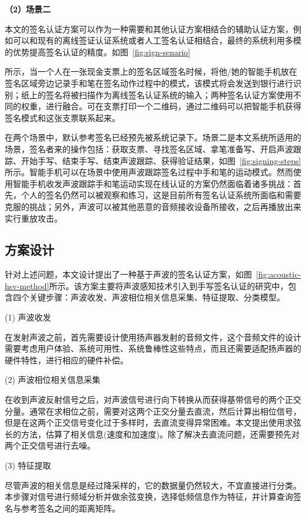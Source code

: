 \textbf{（2）场景二}

本文的签名认证方案可以作为一种需要和其他认证方案相结合的辅助认证方案，例如可以和现有的离线签证认证系统或者人工签名认证相结合，最终的系统利用多模的优势提高签名认证的精度。如图~\ref{fig:sign-senario}

所示，当一个人在一张现金支票上的签名区域签名时候，将他/她的智能手机放在签名区域旁边记录手和笔在签名动作过程中的模式，该模式将会发送到银行进行识别；纸上的签名将被扫描作为离线签名认证系统的输入；两种签名认证方案使用不同的权重，进行融合。可在支票打印一个二维码，通过二维码可以把智能手机获得签名模式和这张支票联系起来。


在两个场景中，默认参考签名已经预先被系统记录下。场景二是本文系统所适用的场景，签名者来的操作包括：获取支票、寻找签名区域、拿笔准备写、开启声波跟踪、开始手写、结束手写、结束声波跟踪、获得验证结果，如图~\ref{fig:signing-steps}所示。智能手机可以在场景中使用声波跟踪签名过程中手和笔的运动模式。然而使用智能手机收发声波跟踪手和笔运动实现在线认证的方案仍然面临着诸多挑战：首先，个人的签名仍然可以被观察和练习，这是目前所有签名认证系统所面临和需要克服的挑战；另外，声波可以被其他恶意的音频接收设备所接收，之后再播放出来实行重放攻击。


\subsection{方案设计}
针对上述问题，本文设计提出了一种基于声波的签名认证方案，如图~\ref{fig:acoustic-hsv-method}所示。该方案主要将声波感知技术引入到手写签名认证的研究中，包含四个关键步骤：声波收发、声波相位相关信息采集、特征提取、分类模型。


(1) 声波收发

在发射声波之前，首先需要设计使用扬声器发射的音频文件，这个音频文件的设计需要考虑用户体验、系统可用性、系统鲁棒性这些特点，而且还需要适配扬声器的硬件特性，进行相应的硬件补偿。


(2) 声波相位相关信息采集

在收到声波反射信号之后，对声波信号进行向下转换从而获得基带信号的两个正交分量。通常在求相位之前，需要对这两个正交分量去直流，然后计算出相位信号，但是在这两个正交信号变化过于多样时，去直流变得异常困难。本文提出使用求弦长的方法，估算了相关信息(速度和加速度)。除了解决去直流问题，还需要预先对两个正交信号进行去噪。


(3) 特征提取

尽管声波的相关信息是经过降采样的，它的数据量仍然较大，不宜直接进行分类。本步骤对信号进行频域分析并做余弦变换，选择低频信息作为特征，并计算查询签名与参考签名之间的距离矩阵。

